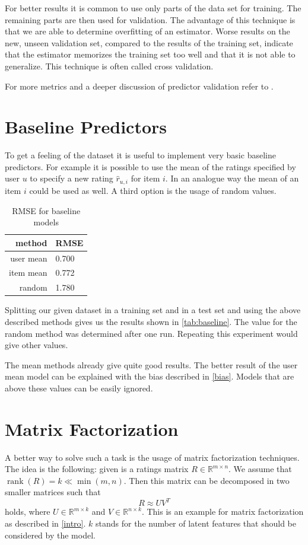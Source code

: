 \documentclass[DIV=14,twocolumn]{scrartcl}
\DeclareMathOperator{\rank}{rank}
\begin{document}
For better results it is common to use only parts of the data set for training. The remaining parts are then used for validation. The advantage of this technique is that we are able to determine overfitting of an estimator. Worse results on the new, unseen validation set, compared to the results of the training set, indicate that the estimator memorizes the training set too well and that it is not able to generalize. This technique is often called cross validation. 

For more metrics and a deeper discussion of predictor validation refer to \cite{Ag16}.

\section{Baseline Predictors}\label{baseline}
To get a feeling of the dataset it is useful to implement very basic baseline predictors. For example it is possible to use the mean of the ratings specified by user $u$ to specify a new rating $\hat{r}_{u,i}$ for item $i$. In an analogue way the mean of an item $i$ could be used as well. A third option is the usage of random values. 

\begin{table}[h]
	\centering
	\begin{tabular}{r|l}
		method & RMSE \\ \hline
		user mean & 0.700 \\
		item mean & 0.772 \\
		random & 1.780
	\end{tabular}
	\caption{RMSE for baseline models}
	\label{tab:baseline}
\end{table}

Splitting our given dataset in a training set and in a test set and using the above described methods gives us the results shown in \autoref{tab:baseline}. The value for the random method was determined after one run. Repeating this experiment would give other values.

The mean methods already give quite good results. The better result of the user mean model can be explained with the bias described in \autoref{bias}. Models that are above these values can be easily ignored. 


\section{Matrix Factorization}\label{matrixfactorization}
A better way to solve such a task is the usage of matrix factorization techniques. The idea is the following: given is a ratings matrix $R\in\mathbb{R}^{m\times n}$. We assume that $\rank(R)=k\ll\min(m,n)$. Then this matrix can be decomposed in two smaller matrices such that 
$$R\approx UV^T$$ holds, where $U\in\mathbb{R}^{m\times k}$ and $V\in\mathbb{R}^{n\times k}$. This is an example for matrix factorization as described in \autoref{intro}. $k$ stands for the number of latent features that should be considered by the model. 
\end{document}
